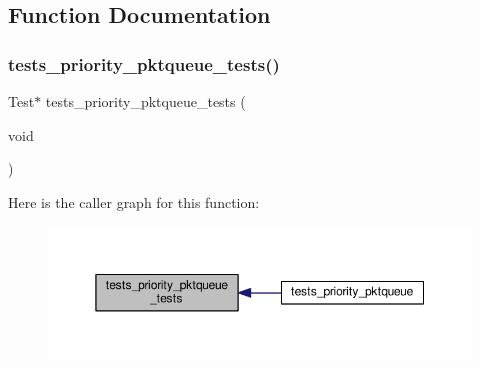\subsection{Function Documentation}
\mbox{\label{tests-priority__pktqueue_8c_a02585a4dfc8e06f88b1c4d77aa1d4784}} 
\subsubsection{\texorpdfstring{tests\+\_\+priority\+\_\+pktqueue\+\_\+tests()}{tests\_priority\_pktqueue\_tests()}}
{\footnotesize\ttfamily Test$\ast$ tests\+\_\+priority\+\_\+pktqueue\+\_\+tests (\begin{DoxyParamCaption}\item[{void}]{ }\end{DoxyParamCaption})}

Here is the caller graph for this function\+:
\nopagebreak
\begin{figure}[H]
\begin{center}
\leavevmode
\includegraphics[width=350pt]{tests-priority__pktqueue_8c_a02585a4dfc8e06f88b1c4d77aa1d4784_icgraph}
\end{center}
\end{figure}
